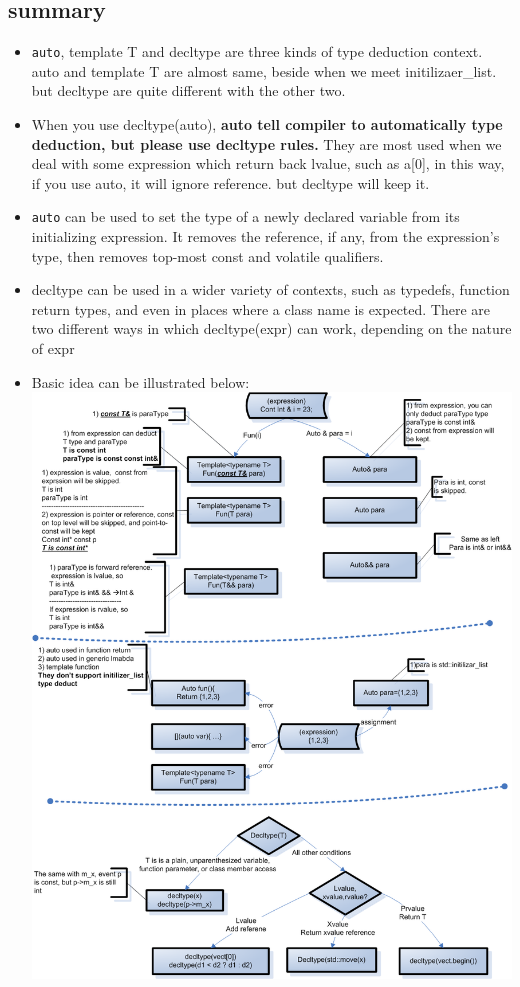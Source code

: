 \documentclass[a4paper,11pt,twoside]{book}
\begin{document}
\subsection{summary}
\begin{itemize}
	\item \texttt{auto}, template T and decltype are three kinds of type deduction context. auto and template T are almost same, beside when we meet initilizaer\_list. but decltype are quite different with the other two. 
	
	\item When you use decltype(auto), \textbf{auto tell compiler to automatically type deduction, but please use decltype rules.} They are most used when we deal with some expression which return back lvalue, such as a[0], in this way, if you use auto, it will ignore reference. but decltype will keep it. 
	
	\item \texttt{auto} can be used to set the type of a newly declared variable from its initializing expression. It removes the reference, if any, from the expression's type, then removes top-most const and volatile qualifiers.
	
	\item decltype can be used in a wider variety of contexts, such as typedefs, function return types, and even in places where a class name is expected. There are two different ways in which decltype(expr) can work, depending on the nature of expr
	
	
	\item Basic idea can be illustrated below: \newline
	\includegraphics[scale=0.7]{pics/type_deduct.png}
\end{itemize}
\end{document}
